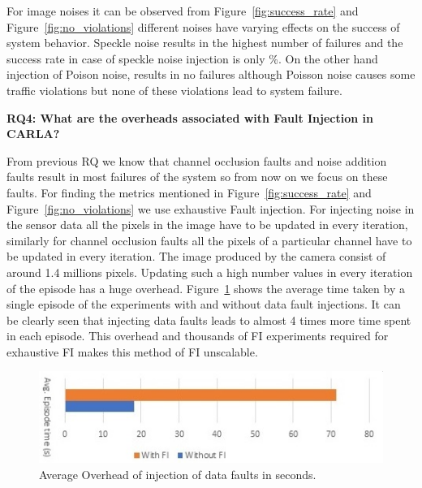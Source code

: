 For image noises it can be observed from Figure~\ref{fig:success_rate} and Figure~\ref{fig:no_violations} different noises have varying effects on the success of system behavior. Speckle noise results in the highest number of failures and the success rate in case of speckle noise injection is only \%. On the other hand injection of Poison noise, results in no failures although Poisson noise causes some traffic violations but none of these violations lead to system failure.

\textbf{RQ4: What are the overheads associated with Fault Injection in CARLA?}

From previous RQ we know that channel occlusion faults and noise addition faults result in most failures of the system so from now on we focus on these faults. For finding the metrics mentioned in Figure~\ref{fig:success_rate} and Figure~\ref{fig:no_violations} we use exhaustive Fault injection. For injecting noise in the sensor data all the pixels in the image have to be updated in every iteration, similarly for channel occlusion faults all the pixels of a particular channel have to be updated in every iteration. The image produced by the camera consist of around 1.4 millions pixels. Updating such a high number values in every iteration of the episode has a huge overhead. Figure~\ref{fig:overhead} shows the average time taken by a single episode of the experiments with and without data fault injections. It can be clearly seen that injecting data faults leads to almost 4 times more time spent in each episode. This overhead and thousands of FI experiments required for exhaustive FI makes this method of FI unscalable. 

\begin{figure}  
	\vspace{1.0em}
	\centering
	\includegraphics[scale=0.7]{overhead}
	\vspace{-0.5em}
	\caption{Average Overhead of injection of data faults in seconds.}
	\label{fig:overhead}
	\vspace{-1.5em}
\end{figure}

